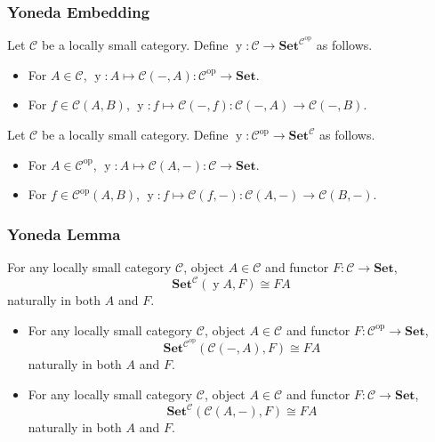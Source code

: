 \documentclass[UTF8,aspectratio=43,11pt,colorlinks,compress,openany]{beamer}%
\begin{document}
\begin{frame}\frametitle{Yoneda Embedding}
\begin{definition}
	Let $\mathcal{C}$ be a locally small category. Define $\operatorname{y}:\mathcal{C}\to\mathbf{Set}^{\mathcal{C}^\mathrm{op}}$ as follows.
\begin{itemize}
	\item For $A\in\mathcal{C}$, $\operatorname{y}: A\mapsto\mathcal{C}(-,A):\mathcal{C}^\mathrm{op}\to\mathbf{Set}$.
	\item For $f\in\mathcal{C}(A,B)$, $\operatorname{y}: f\mapsto\mathcal{C}(-,f): \mathcal{C}(-,A)\to\mathcal{C}(-,B)$.
\end{itemize}
\end{definition}
\begin{definition}
	Let $\mathcal{C}$ be a locally small category. Define $\operatorname{y}:\mathcal{C}^\mathrm{op}\to\mathbf{Set}^\mathcal{C}$ as follows.
\begin{itemize}
	\item For $A\in\mathcal{C}^\mathrm{op}$, $\operatorname{y}: A\mapsto\mathcal{C}(A,-):\mathcal{C}\to\mathbf{Set}$.
	\item For $f\in\mathcal{C}^\mathrm{op}(A,B)$, $\operatorname{y}: f\mapsto\mathcal{C}(f,-): \mathcal{C}(A,-)\to\mathcal{C}(B,-)$.
\end{itemize}
\end{definition}
\end{frame}

\begin{frame}\frametitle{Yoneda Lemma}
\begin{theorem}
	For any locally small category $\mathcal{C}$, object $A\in\mathcal{C}$ and functor $F: \mathcal{C}\to\mathbf{Set}$,
	\[
		\mathbf{Set}^\mathcal{C}(\operatorname{y}A,F)\cong FA
	\]
	naturally in both $A$ and $F$.
\end{theorem}
\begin{theorem}
\begin{itemize}
	\item For any locally small category $\mathcal{C}$, object $A\in\mathcal{C}$ and functor $F: \mathcal{C}^\mathrm{op}\to\mathbf{Set}$,
	\[
		\mathbf{Set}^{\mathcal{C}^\mathrm{op}}(\mathcal{C}(-,A),F)\cong FA
	\]
	naturally in both $A$ and $F$.
	\item For any locally small category $\mathcal{C}$, object $A\in\mathcal{C}$ and functor $F: \mathcal{C}\to\mathbf{Set}$,
	\[
		\mathbf{Set}^\mathcal{C}(\mathcal{C}(A,-),F)\cong FA
	\]
	naturally in both $A$ and $F$.
\end{itemize}
\end{theorem}
\end{frame}
\end{document}
